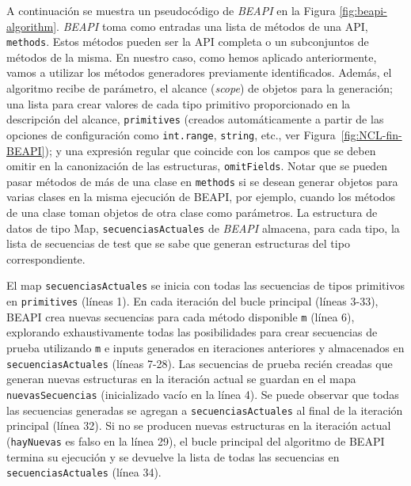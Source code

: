 A continuación se muestra un pseudocódigo de \emph{BEAPI} en la Figura \ref{fig:beapi-algorithm}. 
\emph{BEAPI} toma como entradas una lista de métodos de una API,  \texttt{methods}. 
Estos métodos pueden ser la API completa o un subconjuntos de métodos de la misma. 
En nuestro caso, como hemos aplicado anteriormente, vamos a utilizar los métodos generadores previamente identificados. 
Además, el algoritmo recibe de parámetro, el alcance (\emph{scope}) de objetos para la generación; una lista para crear valores de cada tipo primitivo proporcionado en la descripción del alcance,
\texttt{primitives} (creados automáticamente a partir de las opciones de configuración como \texttt{int.range}, \texttt{string}, etc., ver Figura~\ref{fig:NCL-fin-BEAPI}); 
y una expresión regular que coincide con los campos que se deben omitir en la canonización de las estructuras, \texttt{omitFields}. 
Notar que se pueden pasar métodos de más de una clase en \texttt{methods} si se desean generar objetos para varias clases en la misma ejecución de \textsf{BEAPI},
por ejemplo, cuando los métodos de una clase toman objetos de otra clase como parámetros. 
La estructura de datos de tipo Map, \texttt{secuenciasActuales} de \emph{BEAPI}  almacena, para cada tipo, 
la lista de secuencias de test que se sabe que generan estructuras del tipo correspondiente. 

El map \texttt{secuenciasActuales} se inicia con todas las secuencias de tipos primitivos en \texttt{primitives} (líneas 1). 
En cada iteración del bucle principal (líneas 3-33), \textsf{BEAPI}  crea nuevas secuencias para cada método disponible \texttt{m} (línea 6), 
explorando exhaustivamente todas las posibilidades para crear secuencias de prueba utilizando \texttt{m} e inputs generados en iteraciones anteriores y almacenados en \texttt{secuenciasActuales} (líneas 7-28).
Las secuencias de prueba recién creadas que generan nuevas estructuras en la iteración actual se guardan en el mapa \texttt{nuevasSecuencias} (inicializado vacío en la línea 4). 
Se puede observar que todas las secuencias generadas se agregan a \texttt{secuenciasActuales} al final de la iteración principal (línea 32).
Si no se producen nuevas estructuras en la iteración actual (\texttt{hayNuevas} es falso en la línea 29), el bucle principal del algoritmo de \textsf{BEAPI} termina su ejecución 
y se devuelve la lista de todas las secuencias en \texttt{secuenciasActuales} (línea 34).


